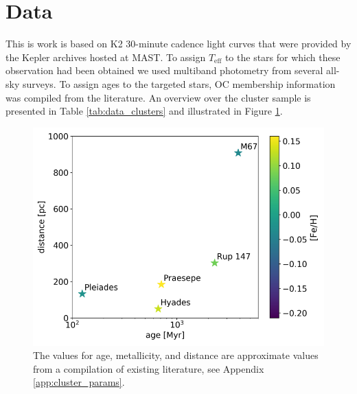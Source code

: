 \documentclass{aa}
\begin{document}
\section{Data}
This is work is based on K2 30-minute cadence light curves that were provided by the Kepler archives hosted at MAST. To assign $T_\mathrm{eff}$ to the stars for which these observation had been obtained we used multiband photometry from several all-sky surveys. To assign ages to the targeted stars, OC membership information was compiled from the literature. An overview over the cluster sample is presented in Table \ref{tab:data_clusters} and illustrated in Figure \ref{fig:OCs}.

     \begin{figure}
            \includegraphics[width=\hsize]{pics/clusters/openclusters_logage_vs_distance.png}
         \caption{The values for age, metallicity, and distance are approximate values from a compilation of existing literature, see Appendix \ref{app:cluster_params}.}
         \label{fig:OCs}
   \end{figure}
\end{document}
